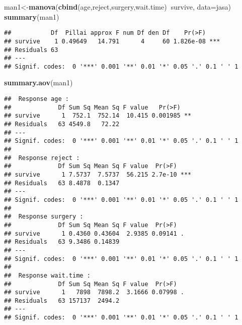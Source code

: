 \documentclass[]{article}
\newenvironment{Shaded}{\begin{snugshade}}{\end{snugshade}}
\newcommand{\DataTypeTok}[1]{\textcolor[rgb]{0.13,0.29,0.53}{#1}}
\newcommand{\KeywordTok}[1]{\textcolor[rgb]{0.13,0.29,0.53}{\textbf{#1}}}
\newcommand{\NormalTok}[1]{#1}
\newcommand{\OperatorTok}[1]{\textcolor[rgb]{0.81,0.36,0.00}{\textbf{#1}}}
\begin{document}
\begin{Shaded}
\begin{Highlighting}[]
\NormalTok{man1<-}\KeywordTok{manova}\NormalTok{(}\KeywordTok{cbind}\NormalTok{(age,reject,surgery,wait.time)}\OperatorTok{~}\NormalTok{survive, }\DataTypeTok{data=}\NormalTok{jasa)}
\KeywordTok{summary}\NormalTok{(man1)}
\end{Highlighting}
\end{Shaded}

\begin{verbatim}
##           Df  Pillai approx F num Df den Df    Pr(>F)    
## survive    1 0.49649   14.791      4     60 1.826e-08 ***
## Residuals 63                                             
## ---
## Signif. codes:  0 '***' 0.001 '**' 0.01 '*' 0.05 '.' 0.1 ' ' 1
\end{verbatim}

\begin{Shaded}
\begin{Highlighting}[]
\KeywordTok{summary.aov}\NormalTok{(man1)}
\end{Highlighting}
\end{Shaded}

\begin{verbatim}
##  Response age :
##             Df Sum Sq Mean Sq F value   Pr(>F)   
## survive      1  752.1  752.14  10.415 0.001985 **
## Residuals   63 4549.8   72.22                    
## ---
## Signif. codes:  0 '***' 0.001 '**' 0.01 '*' 0.05 '.' 0.1 ' ' 1
## 
##  Response reject :
##             Df Sum Sq Mean Sq F value  Pr(>F)    
## survive      1 7.5737  7.5737  56.215 2.7e-10 ***
## Residuals   63 8.4878  0.1347                    
## ---
## Signif. codes:  0 '***' 0.001 '**' 0.01 '*' 0.05 '.' 0.1 ' ' 1
## 
##  Response surgery :
##             Df Sum Sq Mean Sq F value  Pr(>F)  
## survive      1 0.4360 0.43604  2.9385 0.09141 .
## Residuals   63 9.3486 0.14839                  
## ---
## Signif. codes:  0 '***' 0.001 '**' 0.01 '*' 0.05 '.' 0.1 ' ' 1
## 
##  Response wait.time :
##             Df Sum Sq Mean Sq F value  Pr(>F)  
## survive      1   7898  7898.2  3.1666 0.07998 .
## Residuals   63 157137  2494.2                  
## ---
## Signif. codes:  0 '***' 0.001 '**' 0.01 '*' 0.05 '.' 0.1 ' ' 1
\end{verbatim}

\begin{Shaded}
\end{Shaded}
\end{document}
